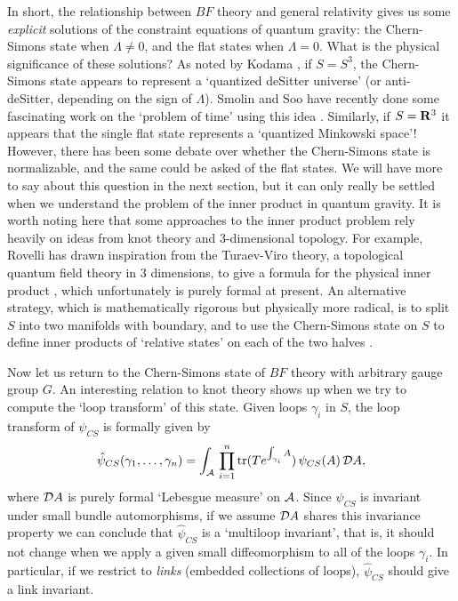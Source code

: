 In short, the relationship between $BF$ theory and general relativity
gives us some {\it explicit} solutions of the constraint equations of
quantum gravity: the Chern-Simons state when $\Lambda \ne 0$, and the
flat states when $\Lambda = 0$.  What is the physical significance of
these solutions?  As noted by Kodama \cite{Kodama}, if $S = S^3$, the
Chern-Simons state appears to represent a `quantized deSitter universe'
(or anti-deSitter, depending on the sign of $\Lambda$).  Smolin and Soo
have recently done some fascinating work on the `problem of time' using
this idea \cite{SS}.  Similarly, if $S = {\bf R}^3$ it appears that the
single flat state represents a `quantized Minkowski space'!  However,
there has been some debate over whether the Chern-Simons state is
normalizable, and the same could be asked of the flat states.  We will
have more to say about this question in the next section, but it can
only really be settled when we understand the problem of the inner
product in quantum gravity.  It is worth noting here that some
approaches to the inner product problem rely heavily on ideas from knot
theory and 3-dimensional topology.  For example, Rovelli has drawn
inspiration from the Turaev-Viro theory, a topological quantum field
theory in 3 dimensions, to give a formula for the physical inner product
\cite{Rovelli2}, which unfortunately is purely formal at present.  An
alternative strategy, which is mathematically rigorous but physically
more radical, is to split $S$ into two manifolds with boundary, and to
use the Chern-Simons state on $S$ to define inner products of `relative
states' on each of the two halves \cite{Baez3,Crane}.

Now let us return to the Chern-Simons state of $BF$ theory with
arbitrary gauge group $G$.  An interesting relation to knot theory shows
up when we try to compute the `loop transform' of this state.  Given
loops $\gamma_i$ in $S$, the loop transform of $\psi_{CS}$ is formally
given by
\[     \hat \psi_{CS}(\gamma_1, \dots, \gamma_n) =
\int_{\A} \,\prod_{i=1}^n \tr(T e^{\int_{\gamma_i} A}) \, \psi_{CS}(A)\,
{\cal D}A, \]
where ${\cal D}A$ is purely formal `Lebesgue measure' on $\A$.  Since
$\psi_{CS}$ is invariant under small bundle automorphisms, if we assume
${\cal D}A$ shares this invariance property we can conclude that $\hat
\psi_{CS}$ is a `multiloop invariant', that is, it should not change
when we apply a given small diffeomorphism to all of the loops
$\gamma_i$.  In particular, if we restrict to {\it links} (embedded
collections of loops), $\hat \psi_{CS}$ should give a link invariant.

